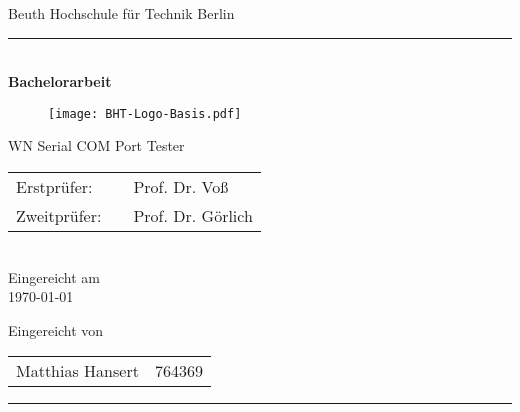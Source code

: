 

\begin{titlepage}
	\begin{center}
		\Large
		Beuth Hochschule für Technik Berlin
		\textcolor{darkBHT}{\rule{\textwidth}{0.2cm}} \\
		\vspace{2 cm}
		\Huge
		\textbf{Bachelorarbeit}
		\vspace{2 cm}
		
		\begin{figure}[htbp]
			\centering 
			\texttt{[image: BHT-Logo-Basis.pdf]}  
		\end{figure}
		
		\vspace{3cm}
		\Large
		WN Serial COM Port Tester\\
		\vspace{3cm}
		\begin{tabular}{lcl}
			Erstprüfer:& &Prof. Dr. Voß\\
			Zweitprüfer:& &Prof. Dr. Görlich\\
		\end{tabular} 
		\\
		\vspace{0.8cm}
		Eingereicht am \\
		\today %
		\vspace{0.8cm}
		
		Eingereicht von \\
		\begin{tabular}{ll}
			Matthias Hansert & 764369\\
		\end{tabular}

	\end{center}
	\vfill
	\textcolor{darkBHT}{\rule{\textwidth}{0.2cm}}
	\vspace{1 cm}
	\normalsize
	
\end{titlepage}

\newpage
\thispagestyle{empty}
\mbox{}